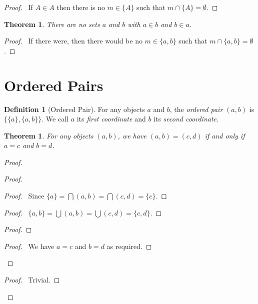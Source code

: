 \documentclass{article}
\let\qed\relax
\newtheorem{theorem}[axiom]{Theorem}
\theoremstyle{definition}
\newtheorem{definition}[axiom]{Definition}
\begin{document}
    \begin{proof}
        \pf\ If $A \in A$ then there is no $m \in \{A\}$ such that $m \cap \{A\} = \emptyset$. \qed
    \end{proof}

    \begin{theorem}
        There are no sets $a$ and $b$ with $a \in b$ and $b \in a$.
    \end{theorem}

    \begin{proof}
        \pf\ If there were, then there would be no $m \in \{ a,b \}$ such that  $m \cap \{ a,b \} = \emptyset$. \qed
    \end{proof}

    \section{Ordered Pairs}

    \begin{definition}[Ordered Pair]
        For any objects $a$ and $b$, the \emph{ordered pair} $(a,b)$ is $\{ \{ a \}, \{a, b \} \}$.
        We call $a$ its \emph{first coordinate} and $b$ its \emph{second coordinate}.
    \end{definition}

    \begin{theorem}
        For any objects $(a,b)$, we have $(a,b) = (c,d)$ if and only if $a = c$ and $b = d$.
    \end{theorem}

    \begin{proof}
        \pf
        \begin{proof}
            \begin{proof}
                \pf\ Since $\{a\} = \bigcap (a,b) = \bigcap (c,d) = \{c\}$.
            \end{proof}
            \begin{proof}
                \pf\ $\{a,b\} = \bigcup (a,b) = \bigcup (c,d) = \{c,d\}$.
            \end{proof}
            \begin{proof}
            \end{proof}
            \begin{proof}
                \pf\ We have $a = c$ and $b = d$ as required.
            \end{proof}
        \end{proof}
        \begin{proof}
            \pf\ Trivial.
        \end{proof}
        \qed
    \end{proof}
\end{document}
